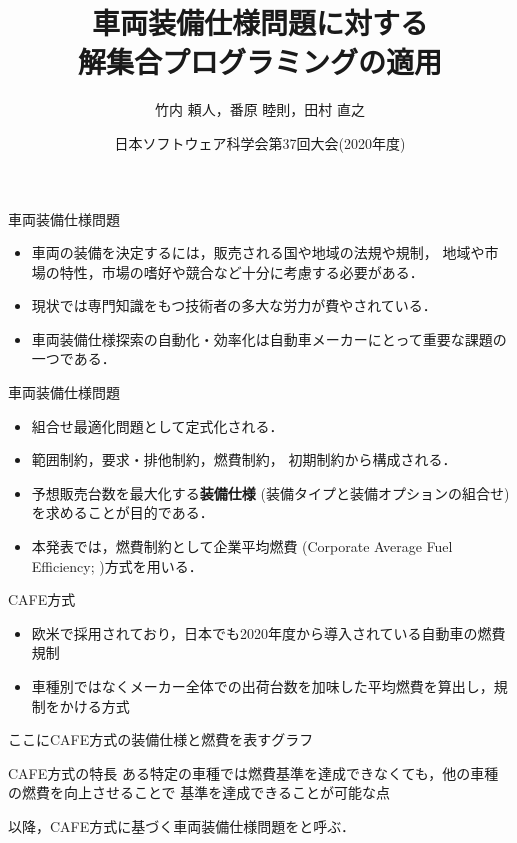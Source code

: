 \documentclass[dvipdfmx, 11pt]{beamer}
\title{車両装備仕様問題に対する\\解集合プログラミングの適用}
\author{竹内 頼人，番原 睦則，田村 直之}
\date{日本ソフトウェア科学会第37回大会(2020年度)}
\begin{document}
\begin{frame} {}
 \titlepage
\end{frame}
\begin{frame}{車両装備仕様問題}
 \begin{itemize}
  \item 車両の装備を決定するには，販売される国や地域の法規や規制，
    地域や市場の特性，市場の嗜好や競合など十分に考慮する必要がある．
  \item 現状では専門知識をもつ技術者の多大な労力が費やされている．
  \item 車両装備仕様探索の自動化・効率化は自動車メーカーにとって重要な課題の一つである．
 \end{itemize}
 \vfill
 \begin{alertblock}{車両装備仕様問題}
  \begin{itemize}
   \item 組合せ最適化問題として定式化される．
   \item \alert{範囲制約}，\alert{要求・排他制約}，\alert{燃費制約}，
	 \alert{初期制約}から構成される．
   \item \alert{予想販売台数を最大化}する{\bf 装備仕様}
	 (装備タイプと装備オプションの組合せ)を求めることが目的である．
  \end{itemize}
 \end{alertblock}
 \begin{itemize}
  \item 本発表では，燃費制約として企業平均燃費
	(Corporate Average Fuel Efficiency; )方式を用いる．
 \end{itemize}
\end{frame}
\begin{frame}{CAFE方式}
 \begin{itemize}
  \item 欧米で採用されており，日本でも2020年度から導入されている自動車の燃費規制
  \item 車種別ではなくメーカー全体での出荷台数を加味した平均燃費を算出し，規制をかける方式
 \end{itemize}
 \begin{exampleblock}{}
  \centering
  ここにCAFE方式の装備仕様と燃費を表すグラフ
 \end{exampleblock}
 \begin{block}{CAFE方式の特長}
  ある特定の車種では燃費基準を達成できなくても，他の車種の燃費を向上させることで
  基準を達成できることが可能な点
 \end{block}
 以降，CAFE方式に基づく車両装備仕様問題をと呼ぶ．
\end{frame}
\end{document}
